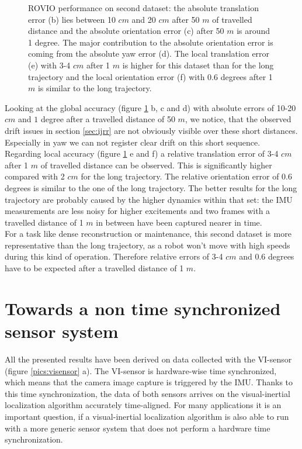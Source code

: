 \begin{figure}[h]
\begin{subfigure}[b]{0.45\textwidth}
    \caption{}
  \end{subfigure}
   \caption{ROVIO performance on second dataset: the absolute translation error (b) lies between 10 $cm$ and 20 $cm$ after 50 $m$ of travelled distance and the absolute orientation error (c) after 50 $m$ is around 1 degree. The major contribution to the absolute orientation error is coming from the absolute yaw error (d). The local translation error (e) with 3-4 $cm$ after 1 $m$ is higher for this dataset than for the long trajectory and the local orientation error (f) with 0.6 degrees after 1 $m$ is similar to the long trajectory.}
   \label{pics:euroc}
\end{figure}

Looking at the global accuracy (figure \ref{pics:euroc} b, c and d) with absolute errors of 10-20 $cm$ and $1$ degree after a travelled distance of 50 $m$, we notice, that the observed drift issues in section \ref{sec:ijrr} are not obviously visible over these short distances. Especially in yaw we can not register clear drift on this short sequence. \\

Regarding local accuracy (figure \ref{pics:euroc} e and f) a relative translation error of 3-4 $cm$ after 1 $m$ of travelled distance can be observed. This is significantly higher compared with 2 $cm$ for the long trajectory. The relative orientation error of 0.6 degrees is similar to the one of the long trajectory. The better results for the long trajectory are probably caused by the higher dynamics within that set: the IMU measurements are less noisy for higher excitements and two frames with a travelled distance of 1 $m$ in between have been captured nearer in time. \\

For a task like dense reconstruction or maintenance, this second dataset is more representative than the long trajectory, as a robot won't move with high speeds during this kind of operation. Therefore relative errors of 3-4 $cm$ and 0.6 degrees have to be expected after a travelled distance of 1 $m$.

\section{Towards a non time synchronized sensor system}
\label{sec:timesync}

All the presented results have been derived on data collected with the VI-sensor (figure \ref{pics:visensor} a). The VI-sensor is hardware-wise time synchronized, which means that the camera image capture is triggered by the IMU. Thanks to this time synchronization, the data of both sensors arrives on the visual-inertial localization algorithm accurately time-aligned. For many applications it is an important question, if a visual-inertial localization algorithm is also able to run with a more generic sensor system that does not perform a hardware time synchronization. \\

